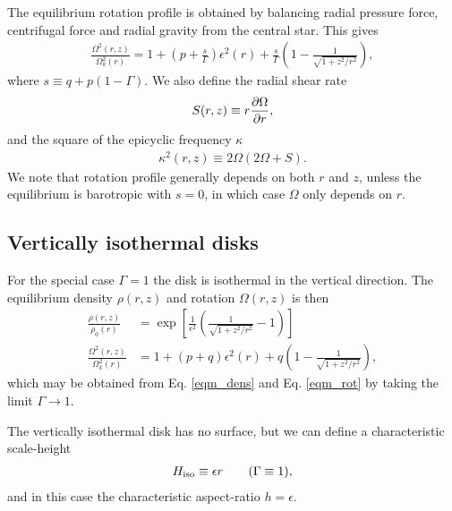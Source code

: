 The equilibrium rotation profile is obtained by balancing radial
pressure force, centrifugal force and radial gravity from the central
star. This gives 
\begin{align}\label{eqm_rot}
  \frac{\Omega^2(r,z)}{\Omega_k^2(r)}=1 +
  \left(p+\frac{s}{\Gamma}\right)\epsilon^2(r) 
  +\frac{s}{\Gamma} \left(1-\frac{1}{\sqrt{1+z^2/r^2}}\right), 
\end{align}
where $s\equiv q+p(1-\Gamma)$. We also define the radial shear rate  
\begin{align}
  S(r,z) \equiv r\frac{\partial\Omega}{\partial r},  
\end{align}
and the square of the epicyclic frequency $\kappa$ 
\begin{align}
  \kappa^2(r,z) \equiv 2\Omega(2\Omega + S). 
\end{align}
We note that rotation profile generally depends on both $r$ and $z$,
unless the equilibrium is barotropic with $s=0$, in which case
$\Omega$ only depends on $r$. 

\subsection{Vertically isothermal disks}
For the special case $\Gamma=1$ the disk is isothermal in the
vertical direction. The equilibrium density $\rho(r,z)$ and rotation
 $\Omega(r,z)$ is then 
 \begin{align}
   \frac{\rho(r,z)}{\rho_0(r)} &= \exp{\left[\frac{1}{\epsilon^2}\left(\frac{1}{\sqrt{1+z^2/r^2}}-1\right)\right]}\\   
   \frac{\Omega^2(r,z)}{\Omega_k^2(r)}& =1+ (p+q)\epsilon^2(r) + q\left(1 -
     \frac{1}{\sqrt{1+z^2/r^2}}\right),
 \end{align}
which may be obtained from Eq. \ref{eqm_dens} and Eq. \ref{eqm_rot} by
taking the limit $\Gamma\to 1$. 

The vertically isothermal disk has no surface, but we can define a
characteristic scale-height
\begin{align}
  H_\mathrm{iso} \equiv \epsilon r \quad\quad(\Gamma \equiv 1),   
\end{align} 
and in this case the characteristic aspect-ratio $h = \epsilon$. 

 
